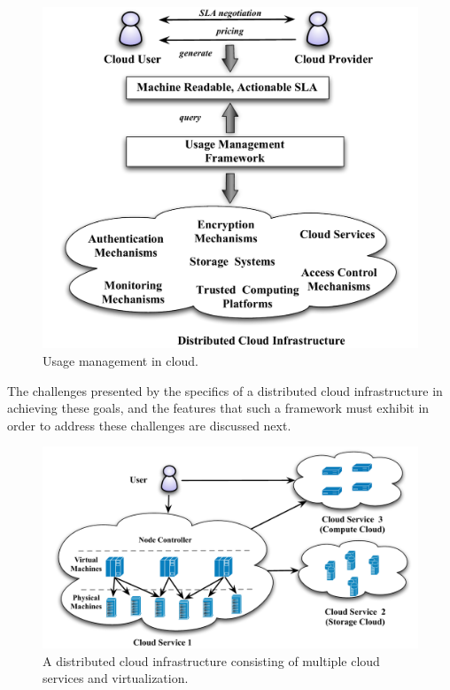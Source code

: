 \documentclass[10pt,letterpaper]{book}
\begin{document}
\begin{figure}[!t]
\centering
\includegraphics[scale=0.4]{cloud-umf}
\caption{Usage management in cloud.}
\label{fig:cloud-umf}
\end{figure}

The challenges presented by the specifics of a distributed cloud infrastructure in achieving these goals, and the features that such a framework must exhibit in order to address these challenges are discussed next. 

\begin{figure}[t]
\centering
\includegraphics[width=14cm]{cloud-infra}
\caption{A distributed cloud infrastructure consisting of multiple cloud services and virtualization.}
\label{fig:cloud-infra}
\end{figure}
\end{document}
